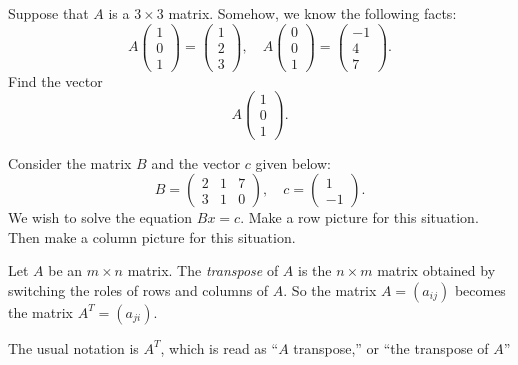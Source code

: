 \documentclass[cahier-main.tex]{subfiles}
\begin{document}
\begin{task}
Suppose that $A$ is a $3\times 3$ matrix. Somehow, we know the following facts:
\[
A\begin{pmatrix} 1 \\ 0 \\ 1 \end{pmatrix} = \begin{pmatrix} 1 \\2 \\3 \end{pmatrix},
 \quad A\begin{pmatrix} 0 \\ 0 \\ 1 \end{pmatrix} = \begin{pmatrix} -1 \\ 4 \\ 7 \end{pmatrix}. 
\]
Find the vector
\[
A \begin{pmatrix} 1 \\ 0 \\ 1 \end{pmatrix}.
\]

\end{task}

\begin{task}
Consider the matrix $B$ and the vector $c$ given below:
\[
B = \begin{pmatrix} 2 & 1 & 7 \\ 3 & 1 & 0 \end{pmatrix}, \quad c = \begin{pmatrix} 1 \\ -1 \end{pmatrix} .
\]
We wish to solve the equation $Bx=c$. Make a row picture for this situation. Then make a column picture for this situation.
\end{task}

\begin{definition} Let $A$ be an $m\times n$ matrix. The \emph{transpose} of $A$ is 
the $n\times m$ matrix obtained by switching the roles of rows and columns of $A$. So the matrix $A = (a_{ij})$ becomes the matrix $A^T = (a_{ji})$.

The usual notation is $A^T$, which is read as ``$A$ transpose,'' or ``the transpose of $A$''
\end{definition}
\end{document}
